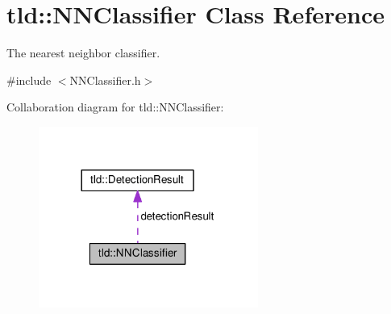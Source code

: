 \hypertarget{classtld_1_1NNClassifier}{\section{tld\-:\-:N\-N\-Classifier Class Reference}
\label{classtld_1_1NNClassifier}
}


The nearest neighbor classifier.  




{\ttfamily \#include $<$N\-N\-Classifier.\-h$>$}



Collaboration diagram for tld\-:\-:N\-N\-Classifier\-:\nopagebreak
\begin{figure}[H]
\begin{center}
\leavevmode
\includegraphics[width=204pt]{classtld_1_1NNClassifier__coll__graph}
\end{center}
\end{figure}
